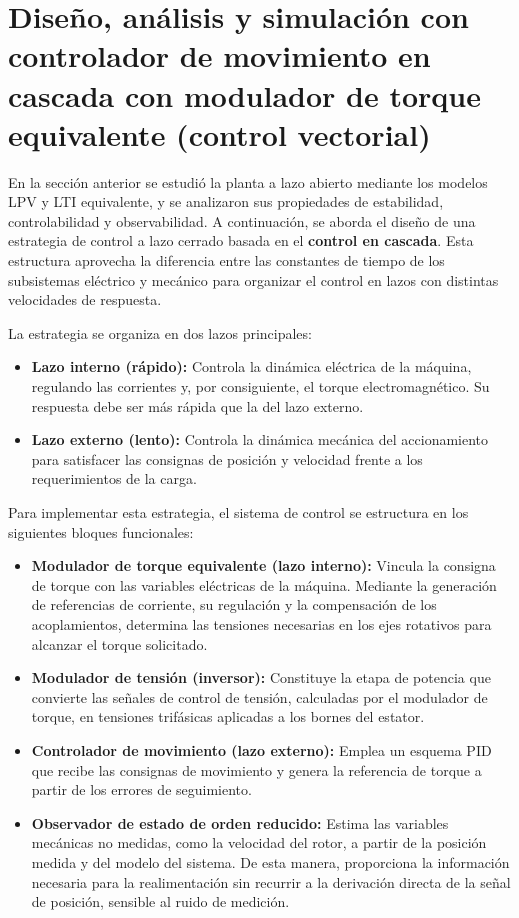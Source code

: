 \documentclass[blue,fullpaper]{ludusofficial}  %
\begin{document}

\section{Diseño, análisis y simulación con controlador de movimiento en
cascada con modulador de torque equivalente (control vectorial)}

En la sección anterior se estudió la planta a lazo abierto mediante los modelos LPV y LTI equivalente, y se analizaron sus propiedades de estabilidad, controlabilidad y observabilidad. A continuación, se aborda el diseño de una estrategia de control a lazo cerrado basada en el \textbf{control en cascada}. Esta estructura aprovecha la diferencia entre las constantes de tiempo de los subsistemas eléctrico y mecánico para organizar el control en lazos con distintas velocidades de respuesta.

La estrategia se organiza en dos lazos principales:

\begin{itemize}
    \item \textbf{Lazo interno (rápido):} Controla la dinámica eléctrica de la máquina, regulando las corrientes y, por consiguiente, el torque electromagnético. Su respuesta debe ser más rápida que la del lazo externo.
    \item \textbf{Lazo externo (lento):} Controla la dinámica mecánica del accionamiento para satisfacer las consignas de posición y velocidad frente a los requerimientos de la carga.
\end{itemize}
    
Para implementar esta estrategia, el sistema de control se estructura en los siguientes bloques funcionales:

\begin{itemize}
    \item \textbf{Modulador de torque equivalente (lazo interno):} Vincula la consigna de torque con las variables eléctricas de la máquina. Mediante la generación de referencias de corriente, su regulación y la compensación de los acoplamientos, determina las tensiones necesarias en los ejes rotativos para alcanzar el torque solicitado.
    \item \textbf{Modulador de tensión (inversor):} Constituye la etapa de potencia que convierte las señales de control de tensión, calculadas por el modulador de torque, en tensiones trifásicas aplicadas a los bornes del estator.
    \item \textbf{Controlador de movimiento (lazo externo):} Emplea un esquema PID que recibe las consignas de movimiento y genera la referencia de torque a partir de los errores de seguimiento.
    \item \textbf{Observador de estado de orden reducido:} Estima las variables mecánicas no medidas, como la velocidad del rotor, a partir de la posición medida y del modelo del sistema. De esta manera, proporciona la información necesaria para la realimentación sin recurrir a la derivación directa de la señal de posición, sensible al ruido de medición.
\end{itemize}
\end{document}
